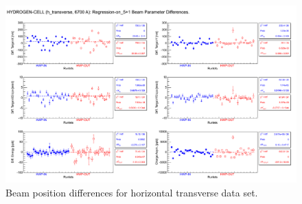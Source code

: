 %
%
%
%

\begin{figure}[!h]
	\begin{center}
	\includegraphics[width=15.0cm]{figures/transverse_LH2_h_diff}
	\end{center}
	\caption
	{Beam position differences for horizontal transverse data set.}
	\label{fig:transverse_LH2_h_diff}
\end{figure}

